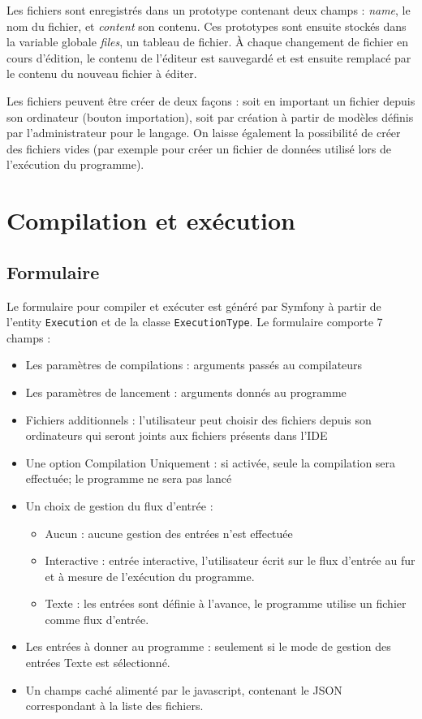 Les fichiers sont enregistrés dans un prototype contenant deux champs : \emph{name}, le nom du fichier, et \emph{content} son contenu. Ces prototypes sont ensuite stockés dans la variable globale \emph{files}, un tableau de fichier. À chaque changement de fichier en cours d'édition, le contenu de l'éditeur est sauvegardé et est ensuite remplacé par le contenu du nouveau fichier à éditer.

Les fichiers peuvent être créer de deux façons : soit en important un fichier depuis son ordinateur (bouton importation), soit par création à partir de modèles définis par l'administrateur pour le langage.
On laisse également la possibilité de créer des fichiers vides (par exemple pour créer un fichier de données utilisé lors de l'exécution du programme).


\section{Compilation et exécution}

\subsection{Formulaire}

Le formulaire pour compiler et exécuter est généré par Symfony à partir de l'entity \texttt{Execution} et de la classe \texttt{ExecutionType}. Le formulaire comporte 7 champs :
\begin{itemize}
  \item Les paramètres de compilations : arguments passés au compilateurs
  \item Les paramètres de lancement : arguments donnés au programme
  \item Fichiers additionnels : l'utilisateur peut choisir des fichiers depuis son ordinateurs qui seront joints aux fichiers présents dans l'IDE
  \item Une option Compilation Uniquement : si activée, seule la compilation sera effectuée; le programme ne sera pas lancé
  \item{ Un choix de gestion du flux d'entrée :
  \begin{itemize}
    \item Aucun : aucune gestion des entrées n'est effectuée
    \item Interactive : entrée interactive, l'utilisateur écrit sur le flux d'entrée au fur et à mesure de l'exécution du programme.
    \item Texte : les entrées sont définie à l'avance, le programme utilise un fichier comme flux d'entrée.
  \end{itemize}}
  \item Les entrées à donner au programme : seulement si le mode de gestion des entrées Texte est sélectionné.
  \item Un champs caché alimenté par le javascript, contenant le JSON correspondant à la liste des fichiers.
\end{itemize}

